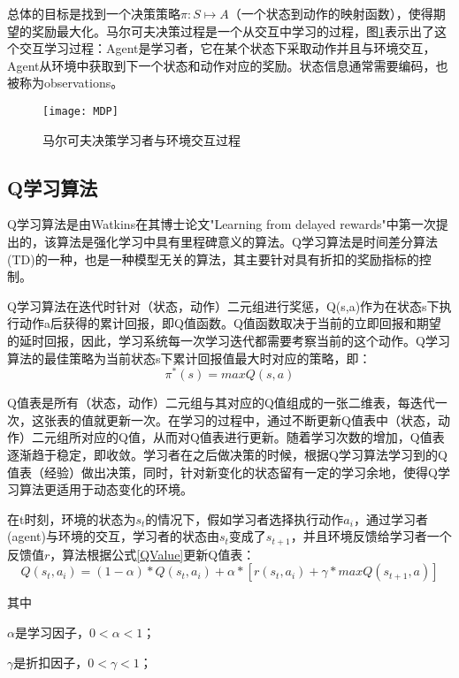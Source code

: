总体的目标是找到一个决策策略$\pi :S\longmapsto A$（一个状态到动作的映射函数），使得期望的奖励最大化。马尔可夫决策过程是一个从交互中学习的过程，图\ref{Interaction}表示出了这个交互学习过程：Agent是学习者，它在某个状态下采取动作并且与环境交互，Agent从环境中获取到下一个状态和动作对应的奖励。状态信息通常需要编码，也被称为observations。
\begin{figure}[h]
    \centering
    \texttt{[image: MDP]}
    \caption{马尔可夫决策学习者与环境交互过程}
    \label{Interaction}
\end{figure}

\subsection{Q学习算法}
Q学习算法\cite{QLearning2}是由Watkins在其博士论文"Learning from delayed rewards"\cite{QLearning0}中第一次提出的，该算法是强化学习中具有里程碑意义的算法。Q学习算法是时间差分算法(TD)\cite{QLearning1}的一种，也是一种模型无关的算法，其主要针对具有折扣的奖励指标的控制。

Q学习算法在迭代时针对（状态，动作）二元组进行奖惩，Q(s,a)作为在状态s下执行动作a后获得的累计回报，即Q值函数。Q值函数取决于当前的立即回报和期望的延时回报，因此，学习系统每一次学习迭代都需要考察当前的这个动作。Q学习算法的最佳策略为当前状态s下累计回报值最大时对应的策略，即：
\begin{equation}
    \pi^*(s) = max Q(s,a)
\end{equation}

Q值表是所有（状态，动作）二元组与其对应的Q值组成的一张二维表，每迭代一次，这张表的值就更新一次。在学习的过程中，通过不断更新Q值表中（状态，动作）二元组所对应的Q值，从而对Q值表进行更新。随着学习次数的增加，Q值表逐渐趋于稳定，即收敛。学习者在之后做决策的时候，根据Q学习算法学习到的Q值表（经验）做出决策，同时，针对新变化的状态留有一定的学习余地，使得Q学习算法更适用于动态变化的环境。

在t时刻，环境的状态为$s_t$的情况下，假如学习者选择执行动作$a_i$，通过学习者(agent)与环境的交互，学习者的状态由$s_t$变成了$s_{t+1}$，并且环境反馈给学习者一个反馈值$r$，算法根据公式\ref{QValue}\cite{RLIntroduction}更新Q值表：
\begin{equation}
    \label{QValue}
    Q(s_t,a_i)=(1-\alpha)*Q(s_t,a_i)+\alpha *[r(s_t,a_i)+\gamma *maxQ(s_{t+1},a)]
\end{equation}

其中

$\alpha$是学习因子，$0<\alpha <1$；

$\gamma$是折扣因子，$0<\gamma <1$；

